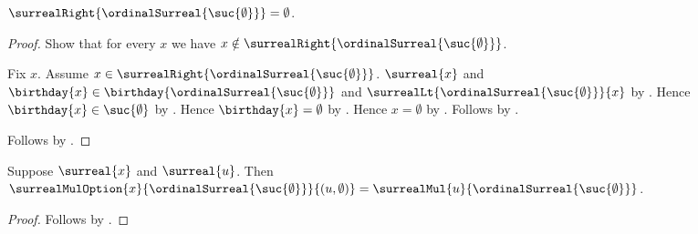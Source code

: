 \begin{proposition}\label{surreal_one_right}
    $\surrealRight{\ordinalSurreal{\suc{\emptyset}}}=\emptyset$.
\end{proposition}
\begin{proof}
    Show that for every $x$ we have
        $x\notin\surrealRight{\ordinalSurreal{\suc{\emptyset}}}$.
    \begin{subproof}
        Fix $x$.
        Assume
            $x\in\surrealRight{\ordinalSurreal{\suc{\emptyset}}}$.
        $\surreal{x}$ and
            $\birthday{x}\in
                \birthday{\ordinalSurreal{\suc{\emptyset}}}$ and
            $\surrealLt{\ordinalSurreal{\suc{\emptyset}}}{x}$
            by .
        Hence $\birthday{x}\in\suc{\emptyset}$
            by .
        Hence $\birthday{x}=\emptyset$ by .
        Hence $x=\emptyset$ by .
        Follows by
            .
    \end{subproof}
    Follows by .
\end{proof}

\begin{lemma}\label{surreal_mul_option_one_zero}
    Suppose $\surreal{x}$ and $\surreal{u}$.
    Then
        $\surrealMulOption{x}{\ordinalSurreal{\suc{\emptyset}}}
            {(u,\emptyset)}
        =\surrealMul{u}{\ordinalSurreal{\suc{\emptyset}}}$.
\end{lemma}
\begin{proof}
    Follows by
        .
\end{proof}

